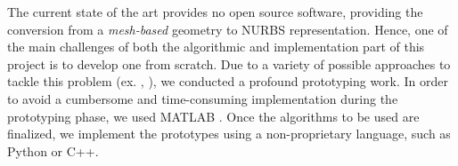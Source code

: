 The current state of the art provides no open source software, providing the conversion from a \textit{mesh-based} geometry to NURBS representation. Hence, one of the main challenges of both the algorithmic and implementation part of this project is to develop one from scratch. Due to a variety of possible approaches to tackle this problem (ex. \cite{becker2011advanced},\cite{eck1996automatic} ), we conducted a profound prototyping work. In order to avoid a cumbersome and time-consuming implementation during the prototyping phase, we used MATLAB \cite{MATLAB}. Once the algorithms to be used are finalized, we implement the prototypes using a non-proprietary language, such as Python or C++.